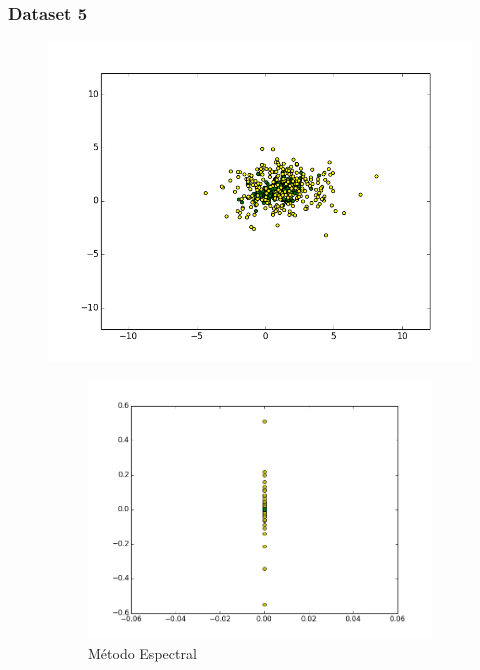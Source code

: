 \documentclass[a4paper,12pt]{article}    %
\begin{document}
\subsubsection{Dataset 5}
\begin{figure}[!ht]
	\centering
	\includegraphics[width=\linewidth]{img/13dataset.png}
	\caption*{N=500, cov1=[[4, 0], [0, 2]], cov2=[[0.9, 0.2], [0.2, 0.3]]}
	\begin{subfigure}{.45\textwidth}
		\centering
		\includegraphics[width=\linewidth]{img/14spectral.png}
		\caption{Método Espectral}
	\end{subfigure}
	\begin{subfigure}{.45\textwidth}
		\centering

\end{subfigure}
\end{figure}
\end{document}
